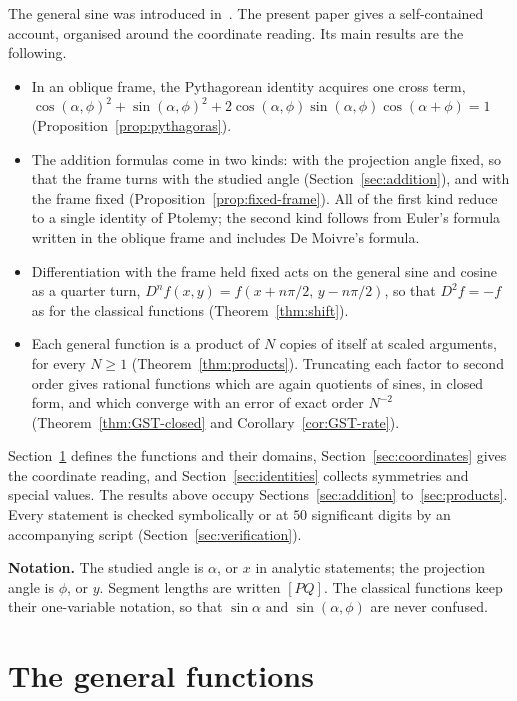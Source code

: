 \documentclass[11pt]{amsart}
\theoremstyle{definition}
\theoremstyle{remark}
\numberwithin{equation}{section}
\begin{document}
The general sine was introduced in~\cite{GeneralSinus}. The present
paper gives a self-contained account, organised around the coordinate
reading. Its main results are the following.
\begin{itemize}
\item In an oblique frame, the Pythagorean identity acquires one cross
  term, $\cos(\alpha,\phi)^2 + \sin(\alpha,\phi)^2
  + 2\cos(\alpha,\phi)\sin(\alpha,\phi)\cos(\alpha+\phi) = 1$
  (Proposition~\ref{prop:pythagoras}).
\item The addition formulas come in two kinds: with the projection angle
  fixed, so that the frame turns with the studied angle
  (Section~\ref{sec:addition}), and with the frame fixed
  (Proposition~\ref{prop:fixed-frame}). All of the first kind reduce to a
  single identity of Ptolemy; the second kind follows from Euler's
  formula written in the oblique frame and includes De Moivre's formula.
\item Differentiation with the frame held fixed acts on the general sine
  and cosine as a quarter turn,
  $D^n f(x,y) = f(x + n\pi/2,\, y - n\pi/2)$, so that $D^2 f = -f$ as for
  the classical functions (Theorem~\ref{thm:shift}).
\item Each general function is a product of $N$ copies of itself at scaled
  arguments, for every $N \ge 1$ (Theorem~\ref{thm:products}). Truncating
  each factor to second order gives rational functions which are again
  quotients of sines, in closed form, and which converge with an error of
  exact order $N^{-2}$ (Theorem~\ref{thm:GST-closed} and
  Corollary~\ref{cor:GST-rate}).
\end{itemize}
Section~\ref{sec:def} defines the functions and their domains,
Section~\ref{sec:coordinates} gives the coordinate reading, and
Section~\ref{sec:identities} collects symmetries and special values. The
results above occupy Sections~\ref{sec:addition}
to~\ref{sec:products}. Every statement is checked symbolically or at
$50$ significant digits by an accompanying script
(Section~\ref{sec:verification}).

\medskip
\noindent\textbf{Notation.} The studied angle is $\alpha$, or $x$ in
analytic statements; the projection angle is $\phi$, or $y$. Segment
lengths are written $[PQ]$. The classical functions keep their one-variable
notation, so that $\sin\alpha$ and $\sin(\alpha,\phi)$ are never confused.

\section{The general functions}
\label{sec:def}
\end{document}
